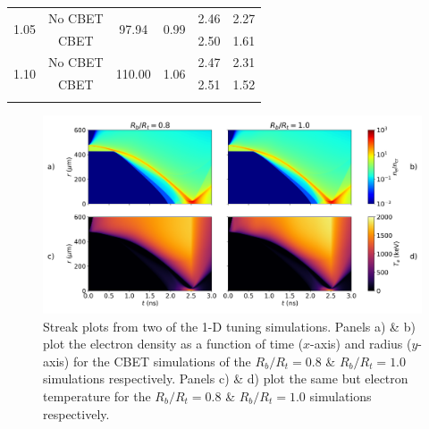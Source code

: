 \begin{table}[]
\begin{tabular}{cccccc}
    \multirow{2}{*}{1.05} & No CBET & \multirow{2}{*}{97.94}                                                             & \multirow{2}{*}{0.99}                                                   & 2.46                                                                      & 2.27                                 \\
                          & CBET    &                                                                                    &                                                                         & 2.50                                                                      & 1.61                                 \\ \hline
    \multirow{2}{*}{1.10} & No CBET & \multirow{2}{*}{110.00}                                                            & \multirow{2}{*}{1.06}                                                   & 2.47                                                                      & 2.31                                 \\
                          & CBET    &                                                                                    &                                                                         & 2.51                                                                      & 1.52                                 \\ \hhline{======}
    \end{tabular}
    \label{tab:res1_1d_tuning}
\end{table}
\egroup

\begin{figure}[t!]
    \includegraphics[width=\linewidth]{Results1/Images/streaks.png}
    \centering
    \caption{Streak plots from two of the 1-D tuning simulations.
    Panels a) \& b) plot the electron density as a function of time ($x$-axis) and radius ($y$-axis) for the \ac{CBET} simulations of the $R_b/R_t=0.8$ \& $R_b/R_t=1.0$ simulations respectively.
    Panels c) \& d) plot the same but electron temperature for the $R_b/R_t=0.8$ \& $R_b/R_t=1.0$ simulations respectively.}%
    \label{fig:Res1_streaks}
\end{figure}


